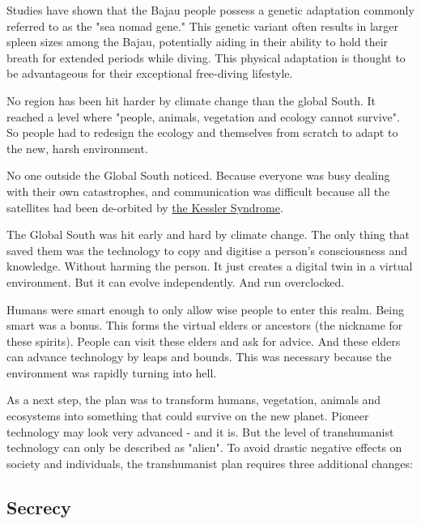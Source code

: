 
Studies have shown that the Bajau people possess a genetic adaptation commonly referred to as the "sea nomad gene." This genetic variant often results in larger spleen sizes among the Bajau, potentially aiding in their ability to hold their breath for extended periods while diving. This physical adaptation is thought to be advantageous for their exceptional free-diving lifestyle.

No region has been hit harder by climate change than the global South. It reached a level where "people, animals, vegetation and ecology cannot survive". So people had to redesign the ecology and themselves from scratch to adapt to the new, harsh environment.

No one outside the Global South noticed. Because everyone was busy dealing with their own catastrophes, and communication was difficult because all the satellites had been de-orbited by \hyperref[sec: Kessler Syndrome]{the Kessler Syndrome}.

The Global South was hit early and hard by climate change. The only thing that saved them was the technology to copy and digitise a person's consciousness and knowledge. Without harming the person. It just creates a digital twin in a virtual environment.
But it can evolve independently. And run overclocked.

Humans were smart enough to only allow wise people to enter this realm. Being smart was a bonus. This forms the virtual elders or ancestors (the nickname for these spirits). People can visit these elders and ask for advice.
And these elders can advance technology by leaps and bounds. This was necessary because the environment was rapidly turning into hell.

As a next step, the plan was to transform humans, vegetation, animals and ecosystems into something that could survive on the new planet. Pioneer technology may look very advanced - and it is. But the level of transhumanist technology can only be described as "alien". To avoid drastic negative effects on society and individuals, the transhumanist plan requires three additional changes:

\subsection{Secrecy}

